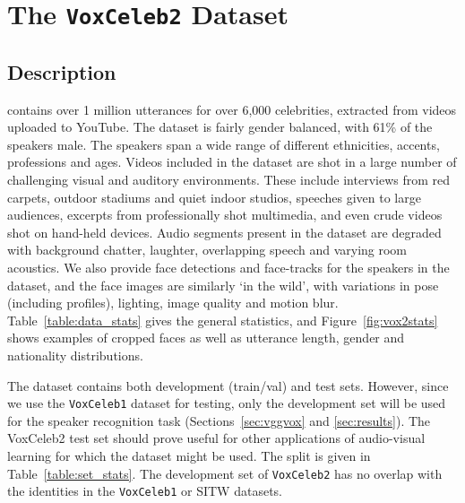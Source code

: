 \documentclass[a4paper]{article}
\def\subsec{\vspace{-5pt}}
\begin{document}
\section{The {\tt VoxCeleb2} Dataset}
\label{sec:dataset}

\subsection{Description}
\subsec{\tt VoxCeleb2} contains over 1 million utterances for over 6,000
celebrities, extracted from videos uploaded to YouTube. The dataset is
fairly gender balanced, with 61\% of the speakers male. The speakers span a
wide range of different ethnicities, accents, professions and ages. 
Videos included in the dataset are shot in a large number of challenging visual and auditory environments. These include interviews from red carpets, outdoor stadiums and quiet indoor studios, speeches given to large audiences, excerpts from professionally shot multimedia, and even crude videos shot on hand-held devices. Audio segments present in the dataset are degraded with background chatter, laughter, overlapping speech and varying room acoustics. 
We also provide face detections and face-tracks for the speakers in the dataset, and the face images are similarly `in the wild', with variations in pose (including profiles), lighting, image quality and motion blur.  Table~\ref{table:data_stats} gives the general statistics, and Figure~\ref{fig:vox2stats} shows examples of cropped faces as well as utterance length, gender and nationality distributions. 

The dataset contains both development (train/val) and test sets.
However, since we use the {\tt VoxCeleb1} dataset for testing,  
only the development set will be used for the speaker
recognition task (Sections~\ref{sec:vggvox} and \ref{sec:results}). The VoxCeleb2 test set
should prove useful for other applications of audio-visual learning
for which the dataset might be used. The split is given in
Table~\ref{table:set_stats}.  The development set of {\tt VoxCeleb2}
has no overlap with the identities in the {\tt VoxCeleb1} or SITW
datasets.
\end{document}
